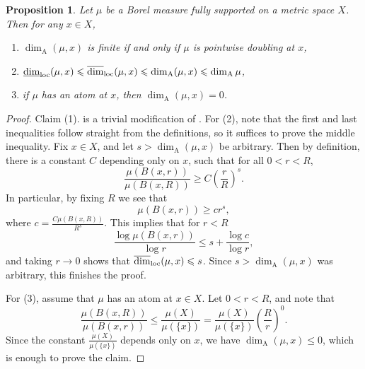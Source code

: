 \documentclass{PRM}
\newcommand{\updim}{\overline{\dim}}
\newcommand{\lowdim}{\underline{\dim}}
\newcommand{\adim}{\dim_{\mathrm{A}}}
\theoremstyle{plain}
\newtheorem{prop}[thm]{Proposition}
\theoremstyle{definition}
\theoremstyle{remark}
\begin{document}
\begin{prop}\label{prop:basic_properties}
Let $\mu$ be a Borel measure fully supported on a metric space $X$. Then for any $x\in X$,
\begin{enumerate}
    \item[(1)] $\dim_{\mathrm{A}}(\mu,x)$ is finite if and only if $\mu$ is pointwise doubling at $x$,
    \item[(2)] $\lowdim_{\textnormal{loc}}(\mu,x)\leq\updim_{\textnormal{loc}}(\mu,x)\leq \dim_{\mathrm{A}}(\mu,x)\leq \adim\mu$,
    \item[(3)] if $\mu$ has an atom at $x$, then $\dim_{\mathrm{A}}(\mu,x)=0$.
\end{enumerate}
\end{prop}
\begin{proof}
    Claim (1). is a trivial modification of \cite[Lemma 4.1.1]{F}. For (2), note that the first and last inequalities follow straight from the definitions, so it suffices to prove the middle inequality. Fix $x\in X$, and let $s> \dim_{\mathrm{A}}(\mu,x)$ be arbitrary. Then by definition, there is a constant $C$ depending only on $x$, such that for all $0<r<R$,
    \begin{equation*}
        \frac{\mu(B(x,r))}{\mu(B(x,R))}\geq C\left(\frac{r}{R}\right)^s.
    \end{equation*}
    In particular, by fixing $R$ we see that
    \begin{equation*}
        \mu(B(x,r))\geq c r^s,
    \end{equation*}
    where $c=\frac{C\mu(B(x,R))}{R^s}$. This implies that for $r<R$
    \begin{equation*}
        \frac{\log\mu(B(x,r))}{\log r}\leq s + \frac{\log c}{\log r},
    \end{equation*}
    and taking $r\to 0$ shows that $\updim_{\textnormal{loc}}(\mu,x)\leq s$. Since $s>\dim_{\mathrm{A}}(\mu,x)$ was arbitrary, this finishes the proof.

    For (3), assume that $\mu$ has an atom at $x\in X$. Let $0<r<R$, and note that
    \begin{equation*}
        \frac{\mu(B(x,R))}{\mu(B(x,r))}\leq \frac{\mu(X)}{\mu(\{x\})}=\frac{\mu(X)}{\mu(\{x\})}\left(\frac{R}{r}\right)^0.
    \end{equation*}
    Since the constant $\frac{\mu(X)}{\mu(\{x\})}$ depends only on $x$, we have $\dim_{\mathrm{A}}(\mu,x)\leq 0$, which is enough to prove the claim.
\end{proof}
\end{document}
